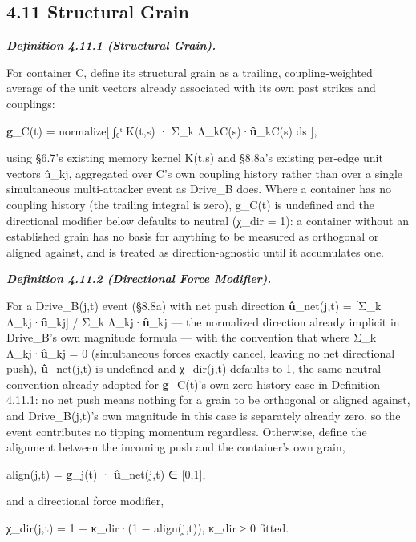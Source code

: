 \documentclass[
]{article}
\begin{document}
\hypertarget{structural-grain}{%
\subsection{4.11 Structural Grain}\label{structural-grain}}

\emph{\textbf{Definition 4.11.1 (Structural Grain).}}

For container C, define its structural grain as a trailing,
coupling-weighted average of the unit vectors already associated with
its own past strikes and couplings:

\textbf{g}\_C(t) = normalize{[} ∫₀ᵗ K(t,s) · Σ\_k
Λ\_kC(s)·\textbf{û}\_kC(s) ds {]},

using §6.7's existing memory kernel K(t,s) and §8.8a's existing per-edge
unit vectors û\_kj, aggregated over C's own coupling history rather than
over a single simultaneous multi-attacker event as Drive\_B does. Where
a container has no coupling history (the trailing integral is zero),
g\_C(t) is undefined and the directional modifier below defaults to
neutral (χ\_dir = 1): a container without an established grain has no
basis for anything to be measured as orthogonal or aligned against, and
is treated as direction-agnostic until it accumulates one.

\emph{\textbf{Definition 4.11.2 (Directional Force Modifier).}}

For a Drive\_B(j,t) event (§8.8a) with net push direction
\textbf{û}\_net(j,t) = {[}Σ\_k Λ\_kj·\textbf{û}\_kj{]} / \textbar Σ\_k
Λ\_kj·\textbf{û}\_kj\textbar{} --- the normalized direction already
implicit in Drive\_B's own magnitude formula --- with the convention
that where \textbar Σ\_k Λ\_kj·\textbf{û}\_kj\textbar{} = 0
(simultaneous forces exactly cancel, leaving no net directional push),
\textbf{û}\_net(j,t) is undefined and χ\_dir(j,t) defaults to 1, the
same neutral convention already adopted for \textbf{g}\_C(t)'s own
zero-history case in Definition 4.11.1: no net push means nothing for a
grain to be orthogonal or aligned against, and Drive\_B(j,t)'s own
magnitude in this case is separately already zero, so the event
contributes no tipping momentum regardless. Otherwise, define the
alignment between the incoming push and the container's own grain,

align(j,t) = \textbar{}\textbf{g}\_j(t) · \textbf{û}\_net(j,t)\textbar{}
∈ {[}0,1{]},

and a directional force modifier,

χ\_dir(j,t) = 1 + κ\_dir·(1 − align(j,t)), κ\_dir ≥ 0 fitted.
\end{document}
